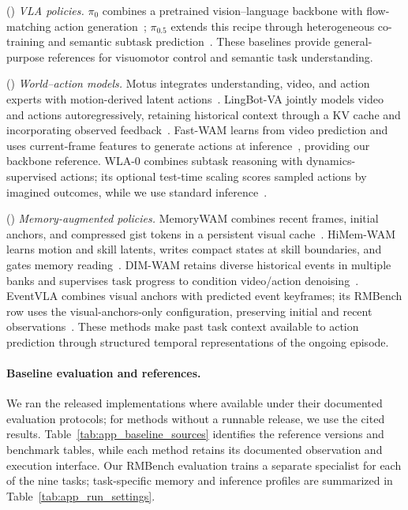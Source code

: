 (\uppercase\expandafter{}) \emph{VLA policies.}
$\pi_0$ combines a pretrained vision--language backbone with flow-matching action generation~\citep{black2025pi0}; $\pi_{0.5}$ extends this recipe through heterogeneous co-training and semantic subtask prediction~\citep{intelligence2025pi05}.
These baselines provide general-purpose references for visuomotor control and semantic task understanding.

(\uppercase\expandafter{}) \emph{World--action models.}
Motus integrates understanding, video, and action experts with motion-derived latent actions~\citep{bi2025motus}.
LingBot-VA jointly models video and actions autoregressively, retaining historical context through a KV cache and incorporating observed feedback~\citep{li2026lingbotva}.
Fast-WAM learns from video prediction and uses current-frame features to generate actions at inference~\citep{yuan2026fastwam}, providing our backbone reference.
WLA-0 combines subtask reasoning with dynamics-supervised actions; its optional test-time scaling scores sampled actions by imagined outcomes, while we use standard inference~\citep{yang2026wla}.

(\uppercase\expandafter{}) \emph{Memory-augmented policies.}
MemoryWAM combines recent frames, initial anchors, and compressed gist tokens in a persistent visual cache~\citep{yang2026memorywam}.
HiMem-WAM learns motion and skill latents, writes compact states at skill boundaries, and gates memory reading~\citep{sun2026himem}.
DIM-WAM retains diverse historical events in multiple banks and supervises task progress to condition video/action denoising~\citep{wang2026dimwam}.
EventVLA combines visual anchors with predicted event keyframes; its RMBench row uses the visual-anchors-only configuration, preserving initial and recent observations~\citep{yang2026eventvla}.
These methods make past task context available to action prediction through structured temporal representations of the ongoing episode.

\paragraph{Baseline evaluation and references.}
We ran the released implementations where available under their documented evaluation protocols; for methods without a runnable release, we use the cited results.
Table~\ref{tab:app_baseline_sources} identifies the reference versions and benchmark tables, while each method retains its documented observation and execution interface.
Our RMBench evaluation trains a separate specialist for each of the nine tasks; task-specific memory and inference profiles are summarized in Table~\ref{tab:app_run_settings}.

